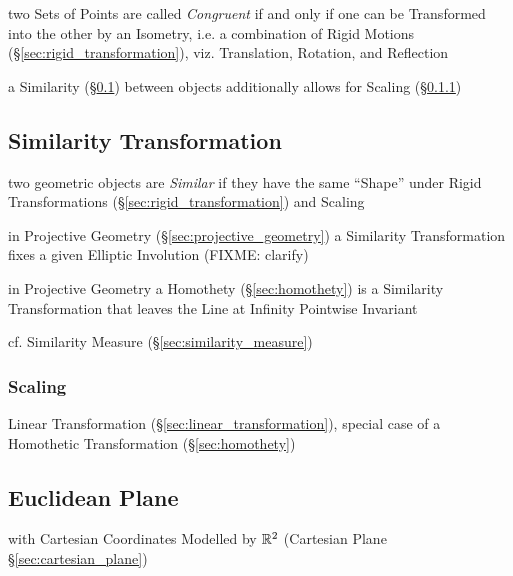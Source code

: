 two Sets of Points are called \emph{Congruent} if and only if one can be
Transformed into the other by an Isometry, i.e. a combination of Rigid Motions
(\S\ref{sec:rigid_transformation}), viz. Translation, Rotation, and Reflection

\fist a Similarity (\S\ref{sec:similarity_transformation}) between objects
additionally allows for Scaling (\S\ref{sec:scaling})



\subsection{Similarity Transformation}\label{sec:similarity_transformation}

two geometric objects are \emph{Similar} if they have the same ``Shape'' under
Rigid Transformations (\S\ref{sec:rigid_transformation}) and Scaling

in Projective Geometry (\S\ref{sec:projective_geometry}) a Similarity
Transformation fixes a given Elliptic Involution (FIXME: clarify)

in Projective Geometry a Homothety (\S\ref{sec:homothety}) is a Similarity
Transformation that leaves the Line at Infinity Pointwise Invariant

\fist cf. Similarity Measure (\S\ref{sec:similarity_measure})



\subsubsection{Scaling}\label{sec:scaling}

Linear Transformation (\S\ref{sec:linear_transformation}), special case of a
Homothetic Transformation (\S\ref{sec:homothety})



\subsection{Euclidean Plane}\label{sec:euclidean_plane}

with Cartesian Coordinates Modelled by $\mathbb{R}^2$ (Cartesian Plane
\S\ref{sec:cartesian_plane})

